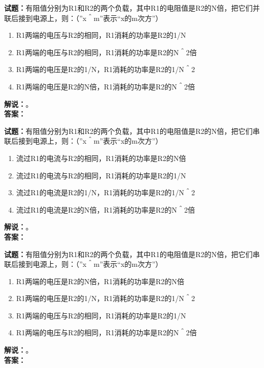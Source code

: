 \documentclass{ctexbook}
\begin{document}
\bigskip




\noindent\textbf{试题：}有阻值分别为R1和R2的两个负载，其中R1的电阻值是R2的N倍，把它们并联后接到电源上，则：（”x＾m”表示“x的m次方”）
\begin{enumerate}[leftmargin=3em]
\item R1两端的电压与R2的相同，R1消耗的功率是R2的1/N
\item R1两端的电压与R2的相同，R1消耗的功率是R2的N＾2倍
\item R1两端的电压是R2的1/N，R1消耗的功率是R2的1/N＾2
\item R1两端的电压是R2的N倍，R1消耗的功率是R2的N＾2倍
\end{enumerate}
\noindent\textbf{解说：}\textbf{}。\\\noindent\textbf{答案：}

\bigskip




\noindent\textbf{试题：}有阻值分别为R1和R2的两个负载，其中R1的电阻值是R2的N倍，把它们串联后接到电源上，则：（”x＾m”表示“x的m次方”）
\begin{enumerate}[leftmargin=3em]
\item 流过R1的电流与R2的相同，R1消耗的功率是R2的N倍
\item 流过R1的电流与R2的相同，R1消耗的功率是R2的1/N
\item 流过R1的电流是R2的1/N，R1消耗的功率是R2的1/N＾2
\item 流过R1的电流是R2的N倍，R1消耗的功率是R2的N＾2倍
\end{enumerate}
\noindent\textbf{解说：}\textbf{}。\\\noindent\textbf{答案：}

\bigskip




\noindent\textbf{试题：}有阻值分别为R1和R2的两个负载，其中R1的电阻值是R2的N倍，把它们串联后接到电源上，则：（”x＾m”表示“x的m次方”）
\begin{enumerate}[leftmargin=3em]
\item R1两端的电压是R2的N倍，R1消耗的功率是R2的N倍
\item R1两端的电压是R2的1/N，R1消耗的功率是R2的1/N＾2
\item R1两端的电压与R2的相同，R1消耗的功率是R2的1/N
\item R1两端的电压与R2的相同，R1消耗的功率是R2的N＾2倍
\end{enumerate}
\noindent\textbf{解说：}\textbf{}。\\\noindent\textbf{答案：}
\end{document}

